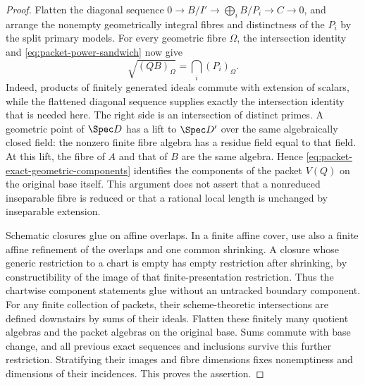 \begin{proof}
Flatten the diagonal sequence
\(0\to B/I'\to\bigoplus_iB/P_i\to C\to0\), and arrange the
nonempty geometrically integral fibres and distinctness of the
\(P_i\) by the split primary models.  For every geometric fibre
\(\Omega\), the intersection identity and
\eqref{eq:packet-power-sandwich} now give
\begin{equation}\label{eq:packet-exact-geometric-components}
 \sqrt{(QB)_\Omega}=\bigcap_i(P_i)_\Omega.
\end{equation}
Indeed, products of finitely generated ideals commute with extension
of scalars, while the flattened diagonal sequence supplies exactly the
intersection identity that is needed here.  The right side is an
intersection of distinct primes.  A geometric point of \(\Spec D\)
has a lift to \(\Spec D'\) over the same algebraically closed
field: the nonzero finite fibre algebra has a residue field equal to
that field.  At this lift, the fibre of \(A\) and that of \(B\)
are the same algebra.  Hence \eqref{eq:packet-exact-geometric-components}
identifies the components of the packet \(V(Q)\) on the original
base itself.  This argument does not assert that a nonreduced
inseparable fibre is reduced or that a rational local length is
unchanged by inseparable extension.

Schematic closures glue on affine overlaps.  In a finite affine
cover, use also a finite affine refinement of the overlaps and one
common shrinking.  A closure whose generic restriction to a chart is
empty has empty restriction after shrinking, by constructibility of
the image of that finite-presentation restriction.  Thus the chartwise
component statements glue without an untracked boundary component.
For any finite collection of packets, their scheme-theoretic
intersections are defined downstairs by sums of their ideals.
Flatten these finitely many quotient algebras and the packet algebras
on the original base.  Sums commute with base change, and all previous
exact sequences and inclusions survive this further restriction.
Stratifying their images and fibre dimensions fixes nonemptiness and
dimensions of their incidences.  This proves the assertion.
\end{proof}

